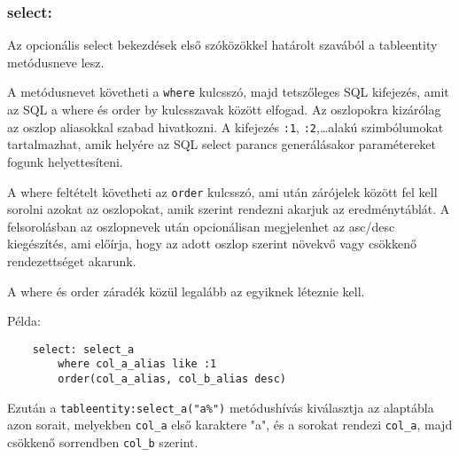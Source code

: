 \subsubsection*{select:}
      
    Az opcionális select bekezdések első szóközökkel határolt 
    szavából a tableentity metódusneve lesz. 

    A metódusnevet követheti a \verb!where! kulcsszó, 
    majd tetszőleges SQL kifejezés, amit az SQL a where és
    order by kulcsszavak között elfogad. Az oszlopokra
    kizárólag az oszlop aliasokkal szabad hivatkozni.
    A kifejezés \verb!:1!, \verb!:2!,\ldots alakú szimbólumokat
    tartalmazhat, amik helyére az SQL select parancs generálásakor
    paramétereket fogunk helyettesíteni.
    
    A where feltételt követheti az \verb!order! kulcsszó,
    ami után zárójelek között fel kell sorolni azokat az oszlopokat, 
    amik szerint rendezni akarjuk az eredménytáblát. 
    A felsorolásban az oszlopnevek után opcionálisan megjelenhet 
    az asc/desc  kiegészítés, ami előírja, hogy az adott oszlop 
    szerint növekvő vagy csökkenő rendezettséget akarunk.
    
    A where és order záradék közül legalább az egyiknek léteznie kell.
    
    Példa:

\begin{verbatim}    
    select: select_a
        where col_a_alias like :1
        order(col_a_alias, col_b_alias desc)
\end{verbatim}

    Ezután a \verb!tableentity:select_a("a%")!
    metódushívás kiválasztja az alaptábla azon sorait,
    melyekben \verb!col_a! első karaktere {"}a", és a sorokat
    rendezi \verb!col_a!, majd csökkenő sorrendben \verb!col_b!
    szerint.

    
    
    
